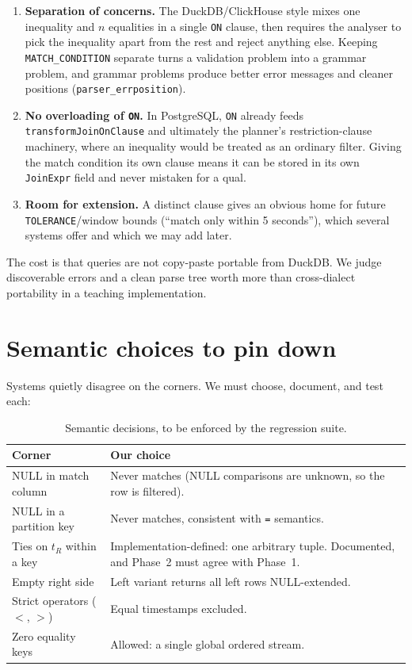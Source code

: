\documentclass[11pt,a4paper]{report}
\theoremstyle{definition}
\theoremstyle{plain}
\newcommand{\code}[1]{\texttt{\small #1}}
\begin{document}
\begin{enumerate}[leftmargin=*]
\item \textbf{Separation of concerns.} The DuckDB/ClickHouse style mixes one inequality and
      $n$ equalities in a single \code{ON} clause, then requires the analyser to pick the
      inequality apart from the rest and reject anything else. Keeping
      \code{MATCH\_CONDITION} separate turns a validation problem into a grammar problem,
      and grammar problems produce better error messages and cleaner positions
      (\code{parser\_errposition}).
\item \textbf{No overloading of \code{ON}.} In PostgreSQL, \code{ON} already feeds
      \code{transformJoinOnClause} and ultimately the planner's restriction-clause
      machinery, where an inequality would be treated as an ordinary filter. Giving the
      match condition its own clause means it can be stored in its own \code{JoinExpr}
      field and never mistaken for a qual.
\item \textbf{Room for extension.} A distinct clause gives an obvious home for future
      \code{TOLERANCE}/window bounds (``match only within 5 seconds''), which several
      systems offer and which we may add later.
\end{enumerate}

The cost is that queries are not copy-paste portable from DuckDB. We judge discoverable
errors and a clean parse tree worth more than cross-dialect portability in a teaching
implementation.

\section{Semantic choices to pin down}

Systems quietly disagree on the corners. We must choose, document, and test each:

\begin{table}[h]
\centering
\footnotesize
\renewcommand{\arraystretch}{1.2}
\begin{tabular}{@{}p{4.3cm}p{8.4cm}@{}}
\toprule
\textbf{Corner} & \textbf{Our choice}\\
\midrule
NULL in match column & Never matches (NULL comparisons are unknown, so the row is filtered).\\
NULL in a partition key & Never matches, consistent with \code{=} semantics.\\
Ties on $t_R$ within a key & Implementation-defined: one arbitrary tuple. Documented, and
Phase~2 must agree with Phase~1.\\
Empty right side & Left variant returns all left rows NULL-extended.\\
Strict operators ($<$, $>$) & Equal timestamps excluded.\\
Zero equality keys & Allowed: a single global ordered stream.\\
\bottomrule
\end{tabular}
\caption{Semantic decisions, to be enforced by the regression suite.}
\end{table}
\end{document}
